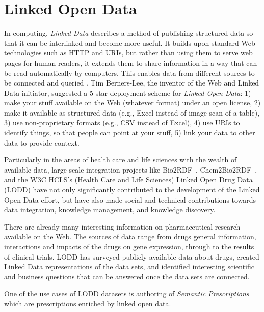 \documentclass[10pt, conference, compsocconf]{IEEEtran}
\begin{document}
\section{Linked Open Data}
\label{sec:lod}
In computing, \emph{Linked Data} describes a method of publishing structured data so that it can be interlinked and become more useful.
It builds upon standard Web technologies such as HTTP and URIs, but rather than using them to serve web pages for human readers, it extends them to share information in a way that can be read automatically by computers.
This enables data from different sources to be connected and queried \cite{linkeddata}.
Tim Berners-Lee, the inventor of the Web and Linked Data initiator, suggested a 5 star deployment scheme for \emph{Linked Open Data}:
1) make your stuff available on the Web (whatever format) under an open license,
2) make it available as structured data (e.g., Excel instead of image scan of a table),
3) use non-proprietary formats (e.g., CSV instead of Excel),
4) use URIs to identify things, so that people can point at your stuff,
5) link your data to other data to provide context.


Particularly in the areas of health care and life sciences with the wealth of available data, large scale integration projects like Bio2RDF~\cite{bio2rdf}, Chem2Bio2RDF~\cite{chembio}, and the W3C HCLS’s (Health Care and Life Sciences) Linked Open Drug Data (LODD)\cite{lodd} have not only significantly contributed to the development of the Linked Open Data effort, but have also made social and technical contributions towards data integration, knowledge management, and knowledge discovery.

There are already many interesting information on pharmaceutical research available on the Web.
The sources of data range from drugs general information, interactions and impacts of the drugs on gene expression, through to the results of clinical trials.
LODD\cite{lodrug} has surveyed publicly available data about drugs, created Linked Data representations of the data sets, and identified interesting scientific and business questions that can be answered once the data sets are connected.

One of the use cases of LODD datasets is authoring of \emph{Semantic Prescriptions} which are prescriptions enriched by linked open data.
\end{document}
